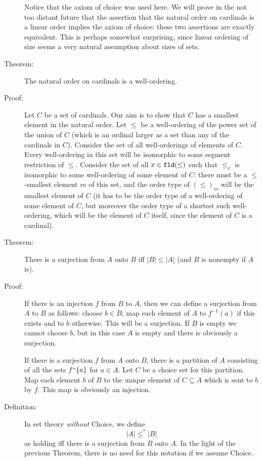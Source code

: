 \documentclass[12pt]{book}
\begin{document}
\begin{description}
Notice that the axiom of choice was used here.  We will prove in the not too distant future that the assertion that the natural order on cardinals is a linear order implies the axiom of choice:  these two assertions are exactly equivalent.  This is perhaps somewhat surprising, since linear ordering of size seems a very natural assumption about sizes of sets.

\item[Theorem:]  The natural order on cardinals is a well-ordering.

\item[Proof:] Let $C$ be a set of cardinals.  Our aim is to show that
$C$ has a smallest element in the natural order.  Let $\leq$ be a
well-ordering of the power set of the union of $C$ (which is an ordinal  larger as a set than any of the cardinals in $C$).
Consider the set of all well-orderings of elements of $C$.  Every well-ordering in this set will be isomorphic to some segment restriction of
$\leq$.  Consider the set of
all $x\in {\tt fld}(\leq)$ such that $\leq_x$ is isomorphic to some well-ordering of some
element of $C$: there must be a $\leq$-smallest element $m$
of this set, and the order type of $(\leq)_m$ will be the smallest element of $C$ (it has to be the order type of a well-ordering of some element of $C$, but moreover the order type of a shortest such well-ordering, which will be the element of $C$ itself, since the element of $C$ is a cardinal).

\item[Theorem:]  There is a surjection from $A$ onto $B$ iff
$|B| \leq |A|$ (and $B$ is nonempty if $A$ is).

\item[Proof:] If there is an injection $f$ from $B$ to $A$, then we
can define a surjection from $A$ to $B$ as follows: choose $b \in B$;
map each element of $A$ to $f^{-1}(a)$ if this exists and to $b$
otherwise.  This will be a surjection.  If $B$ is empty we cannot
choose $b$, but in this case $A$ is empty and there is obviously a
surjection.

If there is a surjection $f$ from $A$ onto $B$, there is a partition
of $A$ consisting of all the sets $f``\{a\}$ for $a \in A$.  Let $C$
be a choice set for this partition.  Map each element $b$ of $B$ to
the unique element of $C\subseteq A$ which is sent to $b$ by $f$.
This map is obviously an injection.

\item[Definition:] In set theory {\em without\/}
Choice, we define $$|A| \leq^* |B|$$ as holding iff there is a surjection
from $B$ onto $A$.  In the light of the previous Theorem, there is no
need for this notation if we assume Choice.




\end{description}
\end{document}
